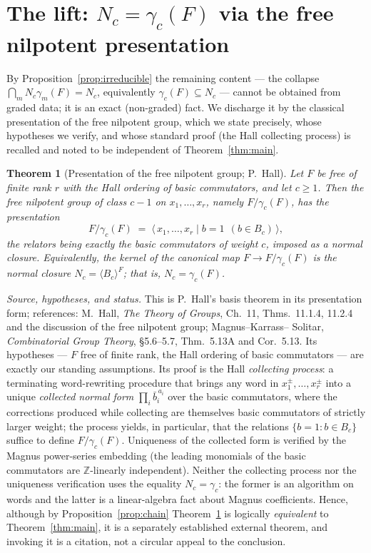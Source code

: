\documentclass{amsart}
\newtheorem{theorem}{Theorem}
\theoremstyle{definition}
\theoremstyle{remark}
\begin{document}
\section{The lift: $N_c=\gamma_c(F)$ via the free nilpotent presentation}\label{sec:lift}

By Proposition~\ref{prop:irreducible} the remaining content --- the collapse
$\bigcap_m N_c\gamma_m(F)=N_c$, equivalently $\gamma_c(F)\subseteq N_c$ --- cannot be
obtained from graded data; it is an exact (non-graded) fact. We discharge it by the
classical presentation of the free nilpotent group, which we state precisely, whose
hypotheses we verify, and whose standard proof (the Hall collecting process) is
recalled and noted to be independent of Theorem~\ref{thm:main}.

\begin{theorem}[Presentation of the free nilpotent group; P.~Hall]
\label{thm:hall-strong}
Let $F$ be free of finite rank $r$ with the Hall ordering of basic commutators, and
let $c\ge1$. Then the free nilpotent group of class $c-1$ on $x_1,\dots,x_r$, namely
$F/\gamma_c(F)$, has the presentation
\[
F/\gamma_c(F)\;=\;\big\langle\, x_1,\dots,x_r \;\big|\; b=1\ \ (b\in B_c)\,\big\rangle ,
\]
the relators being exactly the basic commutators of weight $c$, imposed as a normal
closure. Equivalently, the kernel of the canonical map $F\to F/\gamma_c(F)$ is the
normal closure $N_c=\langle B_c\rangle^{F}$; that is, $N_c=\gamma_c(F)$.
\end{theorem}

\noindent\emph{Source, hypotheses, and status.} This is P.~Hall's basis theorem in
its presentation form; references: M.~Hall, \emph{The Theory of Groups}, Ch.~11,
Thms.~11.1.4, 11.2.4 and the discussion of the free nilpotent group; Magnus--Karrass--
Solitar, \emph{Combinatorial Group Theory}, \S5.6--5.7, Thm.~5.13A and Cor.~5.13.
Its hypotheses --- $F$ free of finite rank, the Hall ordering of basic commutators ---
are exactly our standing assumptions. Its proof is the Hall \emph{collecting process}:
a terminating word-rewriting procedure that brings any word in
$x_1^{\pm},\dots,x_r^{\pm}$ into a unique \emph{collected normal form}
$\prod_i \bar b_i^{\,a_i}$ over the basic commutators, where the corrections produced
while collecting are themselves basic commutators of strictly larger weight; the
process yields, in particular, that the relations $\{b=1:b\in B_c\}$ suffice to define
$F/\gamma_c(F)$. Uniqueness of the collected form is verified by the Magnus power-series
embedding (the leading monomials of the basic commutators are $\mathbb Z$-linearly
independent). Neither the collecting process nor the uniqueness verification uses the
equality $N_c=\gamma_c$: the former is an algorithm on words and the latter is a
linear-algebra fact about Magnus coefficients. Hence, although by
Proposition~\ref{prop:chain} Theorem~\ref{thm:hall-strong} is logically
\emph{equivalent} to Theorem~\ref{thm:main}, it is a separately established external
theorem, and invoking it is a citation, not a circular appeal to the conclusion.
\end{document}
